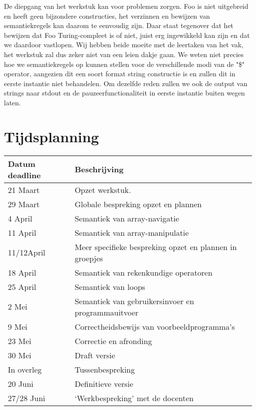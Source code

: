 \documentclass[11pt]{article}
\begin{document}
De diepgang van het werkstuk kan voor problemen zorgen. 
Foo is niet uitgebreid en heeft geen bijzondere constructies, het verzinnen en bewijzen van semantiekregels kan daarom te eenvoudig zijn. 
Daar staat tegenover dat het bewijzen dat Foo Turing-compleet is of niet, juist erg ingewikkeld kan zijn en dat we daardoor vastlopen.
\newline
Wij hebben beide moeite met de leertaken van het vak, het werkstuk zal dus zeker niet van een leien dakje gaan.
\newline
We weten niet precies hoe we semantiekregels op kunnen stellen voor de verschillende modi van de "\$" operator, aangezien dit een soort format string constructie is en zullen dit in eerste instantie niet behandelen. %
Om dezelfde reden zullen we ook de output van strings naar stdout en de pauzeerfunctionaliteit in eerste instantie buiten wegen laten.

\section{Tijdsplanning}

\begin{center}
    \begin{tabular}{ | l | p{10cm} |}
    \hline
    Datum deadline & Beschrijving \\ \hline
    21 Maart   & Opzet werkstuk. \\ \hline
    29 Maart   & Globale bespreking opzet en plannen \\ \hline
    4 April    & Semantiek van array-navigatie \\ \hline
    11 April   & Semantiek van array-manipulatie \\ \hline
    11/12April & Meer specifieke bespreking opzet en plannen in groepjes \\ \hline
    18 April   & Semantiek van rekenkundige operatoren \\ \hline
    25 April   & Semantiek van loops \\ \hline
    2 Mei      & Semantiek van gebruikersinvoer en programmauitvoer \\ \hline
    9 Mei      & Correctheidsbewijs van voorbeeldprogramma's \\ \hline
    23 Mei     & Correctie en afronding \\ \hline
    30 Mei     & Draft versie \\ \hline
    In overleg & Tussenbespreking \\ \hline
    20 Juni    & Definitieve versie \\ \hline
    27/28 Juni & `Werkbespreking' met de docenten \\ \hline
    \hline
    \end{tabular}
\end{center}


%
\end{document}
